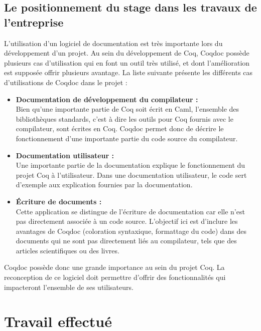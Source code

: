 \documentclass[a4paper, 11pt]{report}
\begin{document}
      \section{Le positionnement du stage dans les travaux de l'entreprise}
      L'utilisation d'un logiciel de documentation est très importante lors du
      développement d'un projet.
      Au sein du développement de Coq, Coqdoc possède plusieurs cas
      d'utilisation qui en font un outil très utilisé, et dont l'amélioration
      est supposée offrir plusieurs avantage. La liste suivante
      présente les différents cas d'utilisations de Coqdoc dans le projet :
      \begin{itemize}
        \item \textbf{Documentation de développement du compilateur :} \\
          Bien qu'une importante partie de Coq soit écrit en Caml, l'ensemble
          des bibliothèques standards, c'est à dire les outils pour Coq
          fournis avec le compilateur, sont écrites en Coq. Coqdoc permet donc
          de décrire le fonctionnement d'une importante partie du code source
          du compilateur.
        \item \textbf{Documentation utilisateur :} \\
          Une importante partie de la documentation explique le fonctionnement
          du projet Coq à l'utilisateur. Dans une documentation utilisateur,
          le code sert d'exemple aux explication fournies par la documentation.
        \item \textbf{Écriture de documents :} \\
          Cette application se distingue de l'écriture de documentation car
          elle n'est pas directement associée à un code source. L'objectif ici
          est d'inclure les avantages de Coqdoc (coloration syntaxique,
          formattage du code) dans des documents qui ne sont pas directement
          liés au compilateur, tels que des articles scientifiques ou des
          livres.
      \end{itemize}

      Coqdoc possède donc une grande importance au sein du projet Coq. La
      reconception de ce logiciel doit permettre d'offrir des fonctionnalités
      qui impacteront l'ensemble de ses utilisateurs.

\chapter{Travail effectué}
\end{document}
